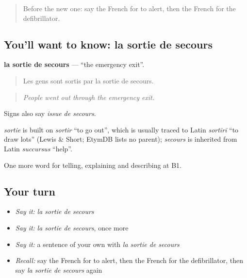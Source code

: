 \begin{quote}
Before the new one: say the French for to alert, then the French for the defibrillator.
\end{quote}

\subsection*{You'll want to know: la sortie de secours}
\textbf{la sortie de secours} — \textquotedblleft{}the emergency exit\textquotedblright{}.

\begin{quote}
Les gens sont sortis par la sortie de secours.
\end{quote}

\begin{quote}
\emph{People went out through the emergency exit.}
\end{quote}

Signs also say \emph{issue de secours}.

\begin{cousinweb}
\emph{sortie} is built on \emph{sortir} \textquotedblleft{}to go out\textquotedblright{}, which is usually traced to Latin \emph{sortīrī} \textquotedblleft{}to draw lots\textquotedblright{} (Lewis \& Short; EtymDB lists no parent); \emph{secours} is inherited from Latin \emph{succursus} \textquotedblleft{}help\textquotedblright{}.
\end{cousinweb}

\begin{grammarlens}[title={What you've built}]
One more word for telling, explaining and describing at B1.
\end{grammarlens}

\subsection*{Your turn}
\begin{itemize}
\raggedright
  \item \emph{Say it:} \emph{la sortie de secours}
  \item \emph{Say it:} \emph{la sortie de secours}, once more
  \item \emph{Say it:} a sentence of your own with \emph{la sortie de secours}
  \item \emph{Recall:} say the French for to alert, then the French for the defibrillator, then say \emph{la sortie de secours} again
\end{itemize}

